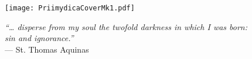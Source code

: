 \documentclass[12pt]{article}
\begin{document}
\begin{titlepage}
\begin{center}
\texttt{[image: PriimydicaCoverMk1.pdf]}
\end{center}
\end{titlepage}


\newpage

\begin{titlepage}
\vspace*{\fill}
\begin{center}
\emph{“… disperse from my soul the twofold darkness in which I was born:} \\
\emph{sin and ignorance.”} \\
\vspace{1em}
— St. Thomas Aquinas
\end{center}
\vspace*{\fill}
\end{titlepage}


\newpage
\end{document}
